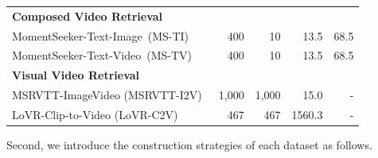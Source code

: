 \begin{table}[t]
\begin{tabular}{l r r r r}
\midrule
\multicolumn{5}{l}{\textbf{Composed Video Retrieval}} \\
MomentSeeker-Text-Image~(MS-TI)~\cite{yuan2025momentseeker} & 400 & 10 & 13.5 & 68.5 \\
MomentSeeker-Text-Video~(MS-TV)~\cite{yuan2025momentseeker} & 400 & 10 & 13.5 & 68.5 \\
\midrule
\multicolumn{5}{l}{\textbf{Visual Video Retrieval}} \\
MSRVTT-ImageVideo (MSRVTT-I2V)~\cite{xu2016msr} & 1,000 & 1,000 & 15.0 & - \\
LoVR-Clip-to-Video (LoVR-C2V)~\cite{cai2025lovr} & 467 & 467 & 1560.3 & - \\
\bottomrule
\end{tabular}
\end{table}

Second, we introduce the construction strategies of each dataset as follows.
